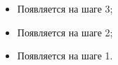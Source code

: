 \begin{itemize}
  \item<3-> Появляется на шаге 3;
  \item<2-> Появляется на шаге 2;
  \item<1-> Появляется на шаге 1.
\end{itemize}
